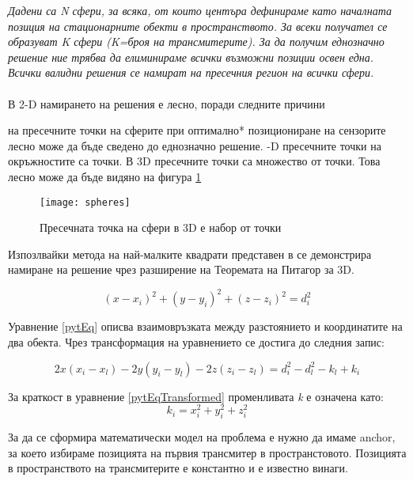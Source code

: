 \textit{Дадени са N сфери, за всяка, от които центъра дефинираме като началната позиция на стационарните обекти в пространството. За всеки получател се образуват K сфери (K=броя на трансмитерите). За да получим еднозначно решение ние трябва да елиминираме всички възможни позиции освен една. Всички валидни решения се намират на пресечния регион на всички сфери.}\\\\ В 2-D намирането на решения е лесно, поради следните причини
\begin{enumerate}
 на пресечните точки на сферите при оптимално* позициониране на сензорите лесно може да бъде сведено до еднозначно решение.
-D пресечните точки на окръжностите са точки. В 3D пресечните точки са множество от точки. Това лесно може да бъде видяно на фигура \ref{spheres}
\end{enumerate}
\begin{figure}
\centerline{\texttt{[image: spheres]}}
\caption{Пресечната точка на сфери в 3D е набор от точки}
\label{spheres}
\end{figure}

Изпозлвайки метода на най-малките квадрати представен в \cite{leastsq} се демонстрира намиране на решение чрез разширение на Теоремата на Питагор за 3D.

\begin{equation} \label{pytEq}
   (x-x_i)^2 + (y-y_i)^2 + (z-z_i)^2=d_i^2
\end{equation}

Уравнение \ref{pytEq} описва взаимовръзката между разстоянието и координатите на два обекта. Чрез трансформация на уравнението се достига до следния запис:

\begin{equation} \label{pytEqTransformed}
  2 x (x_i - x_l) - 2 y (y_i - y_l) - 2  z  (z_i - z_l) = d^2_i - d^2_l - k_l + k_i
\end{equation}

За краткост в уравнение \ref{pytEqTransformed} променливата \textit{k} е означена като: 
\begin{equation} \label{kdesc}
    k_i= x^2_i + y^2_i + z^2_i
\end{equation}

За да се сформира математически модел на проблема е нужно да имаме anchor\cite{leastsq2}, за което избираме позицията на първия трансмитер в пространстовото. Позицията в пространството на трансмитерите е константно и е известно винаги.



